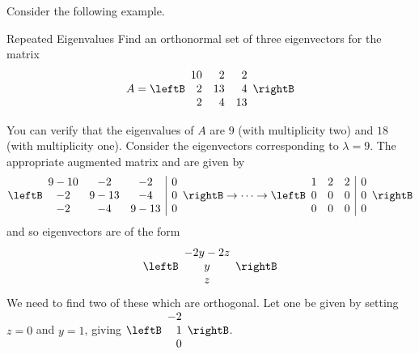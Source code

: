 Consider the following example.

\begin{example}{Repeated Eigenvalues}
Find an orthonormal set of three eigenvectors for the matrix
\begin{equation*}
A = \leftB
\begin{array}{rrr}
10 & 2 & 2 \\
2 & 13 & 4 \\
2 & 4 & 13
\end{array}
\rightB
\end{equation*}
\end{example}

\begin{solution}
You can verify that the eigenvalues of $A$ are $9$ (with multiplicity two) and $18$ (with multiplicity one). Consider the
eigenvectors corresponding to $\lambda =9$. The appropriate augmented matrix
and \rref \;are given by  
\begin{equation*}
\leftB
\begin{array}{ccc|c}
9-10 & -2 & -2 & 0 \\ 
-2 & 9-13 & -4 & 0 \\ 
-2 & -4 & 9-13 & 0
\end{array}
\rightB
\rightarrow \cdots \rightarrow 
\leftB
\begin{array}{rrr|r}
1 & 2 & 2 & 0 \\ 
0 & 0 & 0 & 0 \\ 
0 & 0 & 0 & 0
\end{array}
\rightB
\end{equation*}
and so eigenvectors are of the form 
\begin{equation*}
\leftB
\begin{array}{c}
-2y-2z \\ 
y \\ 
z
\end{array}
\rightB
\end{equation*}
We need to find two of these which are orthogonal. Let one be given by setting $z=0$ and $y=1$, giving $
\leftB
\begin{array}{r}
-2 \\ 
1 \\ 
0
\end{array}
\rightB$. 


\end{solution}
